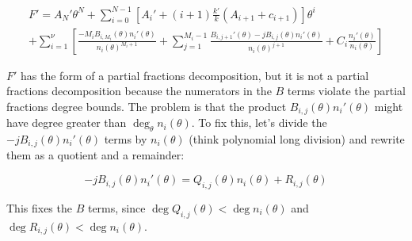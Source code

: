 \begin{comment}
$$F' = A_0' + \sum_{i=1}^N ( A_i' \theta^i + i \frac{k'}{k} (A_i + c_i) \theta^{i-1} )
+ \sum_{i=1}^\nu \sum_{j=1}^{M_i} \frac{B_{i,j}'(\theta) n_i(\theta) - j B_{i,j}(\theta) n_i'(\theta)}{n_i(\theta)^{j+1}}
  + \sum_{i=1}^\nu C_i \frac{n_i'(\theta)}{n_i(\theta)}$$
\end{comment}

\begin{comment}
\begin{multline*}
F' = \sum_{i=0}^{N-1} \left[ A_i' + (i+1) \frac{k'}{k} A_{i+1} \right] \theta^{i} + A_N' \theta^N \\
+ \sum_{i=1}^\nu \sum_{j=1}^{M_i} \frac{B_{i,j}'(\theta) n_i(\theta) - j B_{i,j}(\theta) n_i'(\theta)}{n_i(\theta)^{j+1}}
  + \sum_{i=1}^\nu C_i \frac{n_i'(\theta)}{n_i(\theta)}
\end{multline*}
\end{comment}

\begin{multline*}
F' = A_N' \theta^N + \sum_{i=0}^{N-1} \left[ A_i' + (i+1) \frac{k'}{k} (A_{i+1} + c_{i+1}) \right] \theta^{i} \\
+ \sum_{i=1}^\nu \left[ \frac{- M_i B_{i,M_i}(\theta) n_i'(\theta)}{n_i(\theta)^{M_i+1}} + \sum_{j=1}^{M_i-1} \frac{B_{i,j+1}'(\theta) - j B_{i,j}(\theta) n_i'(\theta)}{n_i(\theta)^{j+1}}
  + C_i \frac{n_i'(\theta)}{n_i(\theta)} \right]
\end{multline*}

$F'$ has the form of a partial fractions decomposition, but it is not
a partial fractions decomposition because the numerators in the $B$
terms violate the partial fractions degree bounds.  The problem
is that the product $B_{i,j}(\theta) n_i'(\theta)$ might
have degree greater than $\deg_\theta n_i(\theta)$.
To fix this, let's
divide the $-jB_{i,j}(\theta)n_i'(\theta)$ terms by $n_i(\theta)$
(think polynomial long division) and rewrite them as a quotient
and a remainder:

$$ - j B_{i,j}(\theta) n_i'(\theta) = Q_{i,j}(\theta) n_i(\theta) + R_{i,j}(\theta)$$

This fixes the $B$ terms, since $\deg Q_{i,j}(\theta) < \deg n_i(\theta)$
and $\deg R_{i,j}(\theta) < \deg n_i(\theta)$.

\begin{comment}
\begin{multline*}
F' = A_N' \theta^N + \sum_{i=0}^{N-1} \left[ A_i' + (i+1) \frac{k'}{k} (A_{i+1} + c_{i+1} \right] \theta^{i} \\
+ \sum_{i=1}^\nu \left[ \sum_{j=1}^{M_i} \frac{B_{i,j+1}'(\theta) + Q_{i,j+1}(\theta) + R_{i,j}(\theta)}{n_i(\theta)^{j+1}}
  + \frac{B_{i,1}'(\theta) + Q_{i,1}(\theta) + C_i n_i'(\theta)}{n_i(\theta)} \right]
\end{multline*}
\end{comment}

